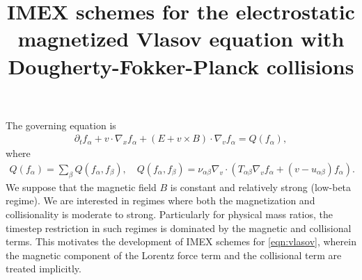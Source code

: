 \documentclass{article}
\title{IMEX schemes for the electrostatic magnetized Vlasov equation with Dougherty-Fokker-Planck collisions}
\begin{document}
\maketitle

The governing equation is
\begin{align}
    \label{eqn:vlasov}

    \partial_t f_\alpha + v \cdot \nabla_x f_\alpha + (E + v \times B) \cdot \nabla_v f_\alpha = Q(f_\alpha),
\end{align}
where 
\begin{align}
    Q(f_\alpha) = \sum_\beta Q(f_\alpha, f_\beta), \quad Q(f_\alpha, f_\beta) = \nu_{\alpha\beta} \nabla_v \cdot (T_{\alpha\beta} \nabla_v f_\alpha + (v - u_{\alpha\beta}) f_\alpha).
\end{align}
We suppose that the magnetic field $B$ is constant and relatively strong (low-beta regime).
We are interested in regimes where both the magnetization and collisionality is moderate to strong.
Particularly for physical mass ratios, the timestep restriction in such regimes is dominated by the magnetic and collisional terms.
This motivates the development of IMEX schemes for \eqref{eqn:vlasov}, wherein the magnetic component of the Lorentz force term and 
the collisional term are treated implicitly.
\end{document}

